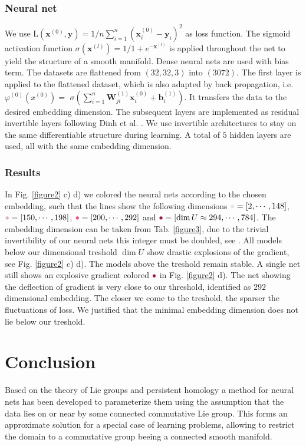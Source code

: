 \documentclass[runningheads,orivec]{llncs}
\begin{document}
\subsubsection*{Neural net} We use $\text{L}(\textbf{x}^{(0)}, \textbf{y}) = 1/n \sum_{i=1}^{n} (\textbf{x}^{(0)}_i-\textbf{y}_i)^2$ as loss function. The sigmoid activation function $\sigma(\mathbf{x}^{(l)}) = 1 / 1 + e^{-\mathbf{x}^{(l)}}$ is applied throughout the net to yield the structure of a smooth manifold. Dense neural nets are used with bias term. The datasets are flattened from $(32,32,3)$ into $(3072)$. The first layer is applied to the flattened dataset, which is also adapted by back propagation, i.e. $\varphi^{(0)}(x^{(0)}) =$ $\sigma(\sum_{i=1}^{n} \textbf{W}_{ji}^{(1)} \textbf{x}_{i}^{(0)} + \textbf{b}_{i}^{(1)})$. It transfers the data to the desired embedding dimension. The subsequent layers are implemented as residual invertible layers following Dinh et al. \cite{DinhSB17}. We use invertible architectures to stay on the same differentiable structure during learning. A total of $5$ hidden layers are used, all with the same embedding dimension.

\subsubsection*{Results} In Fig. \ref{figure2} c) d) we colored the neural nets according to the chosen embedding, such that the lines show the following dimensions ${\color{red1}\bullet} = [2, \cdots, 148]$, ${\color{red2}\bullet} = [150, \cdots, 198]$, ${\color{red3}\bullet} = [200, \cdots, 292]$ and ${\color{red4}\bullet} = [\dim U \approx 294, \cdots, 784]$.  The embedding dimension can be taken from Tab. \ref{figure3}, due to the trivial invertibility of our neural nets this integer must be doubled, see \cite{DinhSB17}. All models below our dimensional treshold $\dim U$ show drastic explosions of the gradient, see Fig. \ref{figure2} c) d). The models above the treshold remain stable. A single net still shows an explosive gradient colored ${\color{red4}\bullet}$ in Fig. \ref{figure2} d). The net showing the deflection of gradient is very close to our threshold, identified as $292$ dimensional embedding. The closer we come to the treshold, the sparser the fluctuations of loss. We justified that the minimal embedding dimension does not lie below our treshold.

\section{Conclusion}
Based on the theory of Lie groups and persistent homology a method for neural nets has been developed to parameterize them using the assumption that the data lies on or near by some connected commutative Lie group. This forms an approximate solution for a special case of learning problems, allowing to restrict the domain to a commutative group beeing a connected smooth manifold. 
\end{document}
